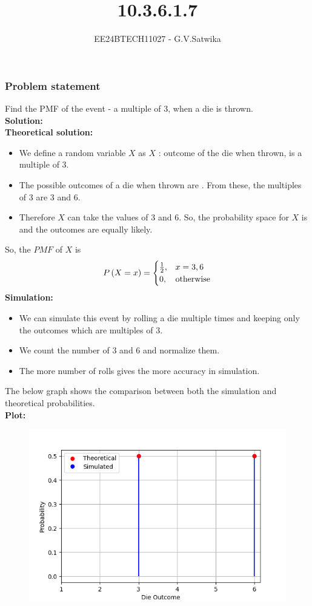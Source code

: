 \documentclass{beamer}
\begin{document}
\title{10.3.6.1.7}
\author{EE24BTECH11027 - G.V.Satwika}
\date{}
\frame{\titlepage}

\begin{frame}
\frametitle{Problem statement}
Find the PMF of the event - a multiple of 3, when a die is thrown.\\ 
\textbf{Solution:}\\
\textbf{Theoretical solution:}\\
	\begin{itemize}
		\item We define a random variable $X$ as $X$ : outcome of the die when thrown, is a multiple of 3.
		\item The possible outcomes of a die when thrown are . From these, the multiples of 3 are 3 and 6.
		\item Therefore $X$ can take the values of 3 and 6. So, the probability space for $X$ is  and the outcomes are equally likely.\\
	\end{itemize}
So, the $PMF$ of $X$ is 
\begin{align}
    P\left(X=x\right)= \begin{cases}
        \frac{1}{2}, & x=3,6\\
        0, & \text{otherwise}
    \end{cases}
\end{align}
\textbf{Simulation:}
	\begin{itemize}
		\item We can simulate this event by rolling a die multiple times and keeping only the outcomes which are multiples of 3.
		\item We count the number of 3 and 6 and normalize them.
		\item The more number of rolls gives the more accuracy in simulation.
	\end{itemize}
The below graph shows the comparison between both the simulation and theoretical probabilities.\\
\textbf{Plot:}\\
\begin{figure}[h!]
   \centering
   \includegraphics[width=1\columnwidth]{figs/fig.png}

\end{figure}
\end{frame}
\end{document}
